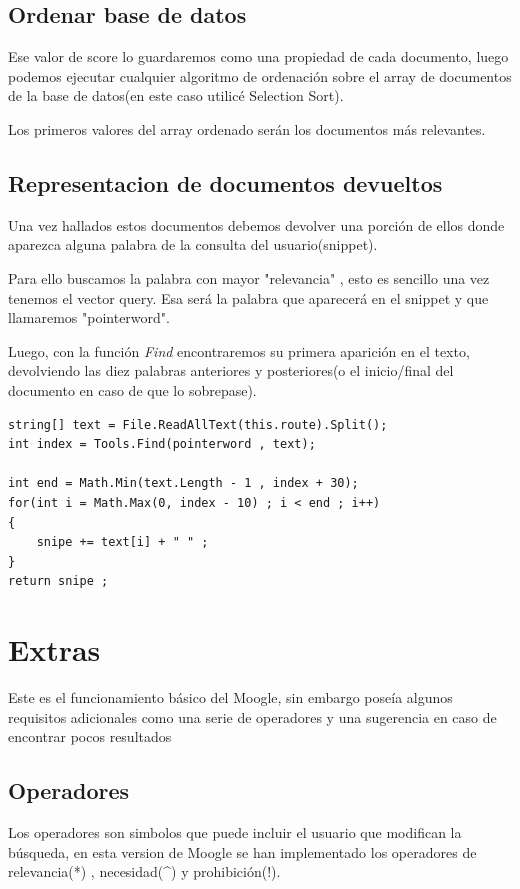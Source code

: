 \documentclass{article}
\begin{document}
\subsection{Ordenar base de datos}
Ese valor de score lo guardaremos como una propiedad de cada documento, luego podemos ejecutar cualquier algoritmo de ordenación
sobre el array de documentos de la base de datos(en este caso utilicé Selection Sort).

Los primeros valores del array ordenado serán los documentos más relevantes.

\subsection{Representacion de documentos devueltos}
Una vez hallados estos documentos debemos devolver una porción de ellos donde aparezca alguna palabra de la consulta del usuario(snippet).

Para ello buscamos la palabra con mayor "relevancia" , esto es sencillo una vez tenemos el vector query. Esa será la palabra que 
aparecerá en el snippet y que llamaremos "pointerword".

Luego, con la función \textit{Find} encontraremos su primera aparición en el texto, devolviendo las diez palabras anteriores y posteriores(o el inicio/final del documento
en caso de que lo sobrepase).\\[5pt]


\begin{lstlisting}[language={[Sharp]C}]
string[] text = File.ReadAllText(this.route).Split();
int index = Tools.Find(pointerword , text);

int end = Math.Min(text.Length - 1 , index + 30);
for(int i = Math.Max(0, index - 10) ; i < end ; i++)
{
    snipe += text[i] + " " ;
}
return snipe ;

\end{lstlisting}


\section{Extras}
Este es el funcionamiento básico del Moogle, sin embargo poseía algunos requisitos adicionales como una serie de operadores
y una sugerencia en caso de encontrar pocos resultados

\subsection{Operadores}
Los operadores son simbolos que puede incluir el usuario que modifican la búsqueda, en esta version de Moogle se han implementado los operadores de
relevancia(*) , necesidad(\textasciicircum) y prohibición(!).
\end{document}
